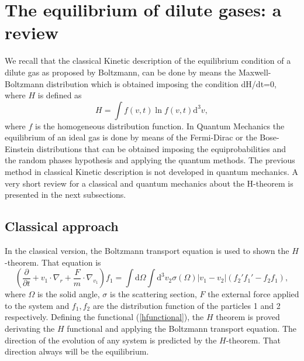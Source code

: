\documentclass{article}
\begin{document}
\section{The equilibrium of dilute gases: a review}
We recall that the classical Kinetic description of the equilibrium condition of a dilute gas as proposed by Boltzmann, can be done by means the Maxwell-Boltzmann distribution which is obtained imposing the condition dH/dt=0, where $H$ is defined as
\begin{equation}
    H=\int f(v,t) \ln f(v,t) \mathrm{d}^{3}v,
\end{equation} \label{hfunctional} 
where $f$ is the homogeneous distribution function.
In Quantum Mechanics the equilibrium of an ideal gas is done by means of the Fermi-Dirac or the Bose-Einstein distributions that can be obtained imposing the equiprobabilities and the random phases hypothesis and applying the quantum methods. The previous method in classical Kinetic description is not developed in quantum mechanics. A very short review for a classical and quantum mechanics about the H-theorem is presented in the next subsections. 

\subsection{Classical approach}
In the classical version, the Boltzmann transport equation is used to shown the $H$-theorem. That equation is
\begin{equation}
    \left( \frac{\partial }{\partial t}+v_1 \cdot \nabla_r +\frac{F}{m} \cdot \nabla_{v_1} \right)f_1=\int \mathrm{d}\Omega \int \mathrm{d}^{3}v_2\sigma(\Omega)|v_1-v_2|(f_2'f_1'-f_2f_1),
\end{equation}
where $\Omega$ is the solid angle, $\sigma$ is the scattering section, $F$ the external force applied to the system and $f_1, f_2$ are the distribution function of the particles 1 and 2 respectively. Defining the functional (\ref{hfunctional}), the $H$ theorem is proved derivating the $H$ functional and applying the Boltzmann transport equation. The direction of the evolution of any system is predicted by the $H$-theorem. That direction always will be the equilibrium.
\
\end{document}
